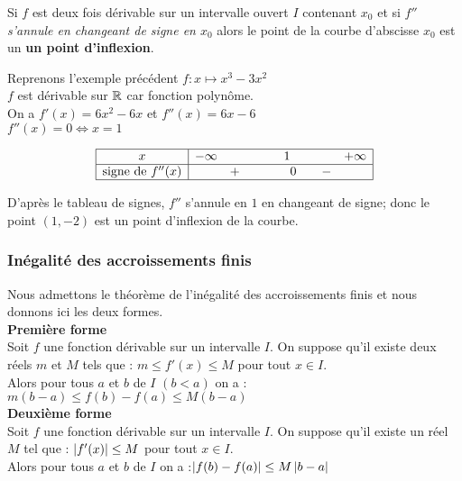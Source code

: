    \begin{theorem}
   Si $ f $ est deux fois dérivable sur  un intervalle ouvert $ I $ contenant $ x_0 $  et si $ f'' $  \emph{ s'annule en changeant de signe  en $ x_0 $} alors le point de la courbe d'abscisse $ x_0 $  est un \textbf{\color{magenta} un point  d'inflexion}.
   \end{theorem}
   
   \begin{example}
   Reprenons l'exemple précédent $ f: x\mapsto x^{3}-3x^{2} $\\ 
   $ f $ est dérivable sur $ \mathbb{R} $ car fonction polynôme.\\
   On a $ f'(x)= 6x^2-6x$ et $ f''(x)= 6x-6 $\\
   $ f''(x)=0 \Longleftrightarrow x=1 $
   \renewcommand{\arraystretch}{1.5}

 \[\begin{array}{|c|ccccc|}
\hline
x & -\infty & & 1 & & +\infty\\ \hline
\text{signe de } f''(x) & & +\qquad &\quad 0  & \quad - & \\
\hline
\end{array}\]

D'après le tableau de signes,  $ f'' $ s'annule en  $ 1 $ en changeant de signe; donc le point $ (1,-2) $ est un point d'inflexion de la courbe.
   \end{example}
   
  \subsubsection*{Inégalité des accroissements finis}
  Nous admettons le théorème de l'inégalité des accroissements finis et nous donnons ici les deux formes.\\
\textbf{\color{magenta}Première forme} \\
 Soit $ f $ une fonction dérivable sur un intervalle $ I $. On suppose qu'il existe deux réels $m $ et $ M$ tels que :\colorbox{green!20!}{ $ m\leq f'(x) \leq M $} \quad pour tout $ x\in I $. \\ Alors pour tous $a $ et $ b$ de $ I $  $(b < a)  $ on a :\colorbox{green!20!} {$ m(b-a)\leq f(b)-f(a) \leq M(b-a) $}  \\
 
 \textbf{\color{magenta}Deuxième forme} \\
 Soit $ f $ une fonction dérivable sur un intervalle $ I $. On suppose qu'il existe un réel $ M$ tel que :\colorbox{green!20!}{ $ \left\lvert  f'(x) \right\rvert \leq M $} \quad pour tout $ x\in I $. \\ Alors pour tous $a $ et $ b$ de $ I $   on a :\colorbox{green!20!} {$ \left\lvert  f(b)-f(a) \right\rvert\leq M \left\lvert b-a \right\rvert$}
 
